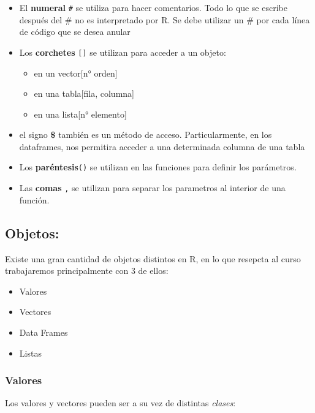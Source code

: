 \documentclass[]{book}
\providecommand{\tightlist}{%
  \setlength{\itemsep}{0pt}\setlength{\parskip}{0pt}}
\begin{document}
\begin{itemize}
\item
  El \textbf{numeral} \texttt{\#} se utiliza para hacer comentarios. Todo lo que se escribe después del \# no es interpretado por R. Se debe utilizar un \# por cada línea de código que se desea anular
\item
  Los \textbf{corchetes} \texttt{{[}{]}} se utilizan para acceder a un objeto:

  \begin{itemize}
  \tightlist
  \item
    en un vector{[}n° orden{]}
  \item
    en una tabla{[}fila, columna{]}
  \item
    en una lista{[}n° elemento{]}
  \end{itemize}
\item
  el signo \textbf{\$} también es un método de acceso. Particularmente, en los dataframes, nos permitira acceder a una determinada columna de una tabla
\item
  Los \textbf{paréntesis}\texttt{()} se utilizan en las funciones para definir los parámetros.
\item
  Las \textbf{comas} \texttt{,} se utilizan para separar los parametros al interior de una función.
\end{itemize}

\hypertarget{objetos}{%
\subsection{Objetos:}\label{objetos}}

Existe una gran cantidad de objetos distintos en R, en lo que resepcta al curso trabajaremos principalmente con 3 de ellos:

\begin{itemize}
\tightlist
\item
  Valores
\item
  Vectores
\item
  Data Frames
\item
  Listas
\end{itemize}

\hypertarget{valores}{%
\subsubsection{Valores}\label{valores}}

Los valores y vectores pueden ser a su vez de distintas \emph{clases}:
\end{document}
